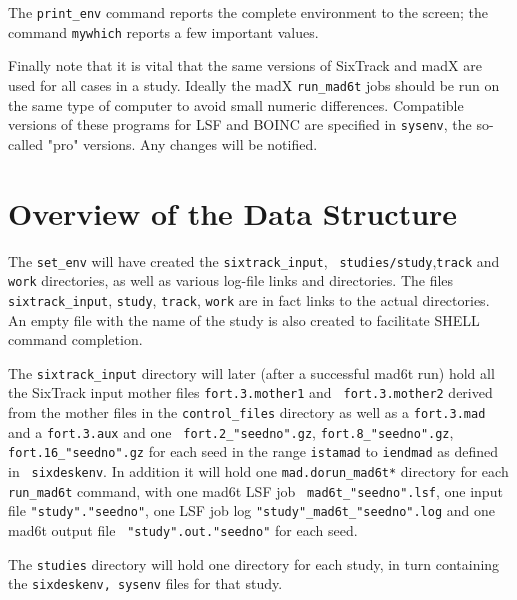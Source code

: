\documentclass{cernatsnote}
\begin{document}
The \texttt{print\_env} command reports the complete environment to the screen;
the command \texttt{mywhich} reports a few important values.

Finally note that it is vital that the same versions of SixTrack and madX are
used for all cases in a study. Ideally the madX \texttt{run\_mad6t} jobs should
be run on the same type of computer to avoid small numeric differences.
Compatible versions of these programs for LSF and BOINC are specified
in \texttt{sysenv}, the so-called "pro" versions. Any changes will be notified.

\section{Overview of the Data Structure}

The \texttt{set\_env} will have created the \texttt{sixtrack\_input}, {\tt
studies/study},\texttt{track} and \texttt{work} directories, as well as various
log-file links and directories.  The files \texttt{sixtrack\_input}, \texttt{study},
\texttt{track}, \texttt{work} are in fact links to the actual directories. An empty
file with the name of the study is also created to facilitate SHELL command
completion.

The \texttt{sixtrack\_input} directory will later (after a successful mad6t run)
hold all the SixTrack input mother files \texttt{fort.3.mother1} and {\tt
fort.3.mother2} derived from the mother files in the \texttt{control\_files}
directory as well as a \texttt{fort.3.mad} and a \texttt{fort.3.aux} and one {\tt
fort.2\_"seedno".gz}, \texttt{fort.8\_"seedno".gz}, \texttt{fort.16\_"seedno".gz} for
each seed in the range \texttt{istamad} to \texttt{iendmad} as defined in {\tt
sixdeskenv}. In addition it will hold one \texttt{mad.dorun\_mad6t*} directory for
each \texttt{run\_mad6t} command, with one mad6t LSF job {\tt
mad6t\_"seedno".lsf}, one input file \texttt{"study"."seedno"}, one LSF job log
\texttt{"study"\_mad6t\_"seedno".log} and one mad6t output file {\tt
"study".out."seedno"} for each seed.

The \texttt{studies} directory will hold one directory for each study, in turn
containing the \texttt{sixdeskenv, sysenv} files for that study.
\end{document}
